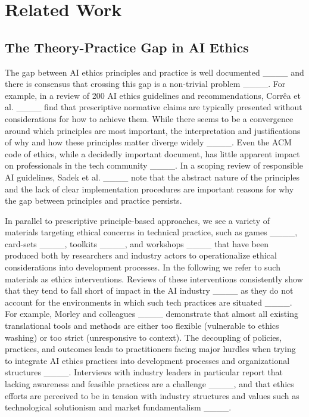 \section{Related Work}
\subsection{The Theory-Practice Gap in AI Ethics}
The gap between AI ethics principles and practice is well documented ____ and there is consensus that crossing this gap is a non-trivial problem ____. For example, in a review of 200 AI ethics guidelines and recommendations, Corrêa et al. ____ find that prescriptive normative claims are typically presented without considerations for how to achieve them. While there seems to be a convergence around which principles are most important, the interpretation and justifications of why and how these principles matter diverge widely ____. Even the ACM code of ethics, while a decidedly important document, has little apparent impact on professionals in the tech community ____. In a scoping review of responsible AI guidelines, Sadek et al. ____ note that the abstract nature of the principles and the lack of clear implementation procedures are important reasons for why the gap between principles and practice persists. 

In parallel to prescriptive principle-based approaches, we see a variety of materials targeting ethical concerns in technical practice, such as games ____, card-sets ____, toolkits ____, and workshops ____ that have been produced both by researchers and industry actors to operationalize ethical considerations into development processes. In the following we refer to such materials as ethics interventions. Reviews of these interventions consistently show that they tend to fall short of impact in the AI industry ____ as they do not account for the environments in which such tech practices are situated ____. For example, Morley and colleagues ____ demonstrate that almost all existing translational tools and methods are either too flexible (vulnerable to ethics washing) or too strict (unresponsive to context). The decoupling of policies, practices, and outcomes leads to practitioners facing major hurdles when trying to integrate AI ethics practices into development processes and organizational structures ____. Interviews with industry leaders in particular report that lacking awareness and feasible practices are a challenge ____, and that ethics efforts are perceived to be in tension with industry structures and values such as technological solutionism and market fundamentalism ____. 


